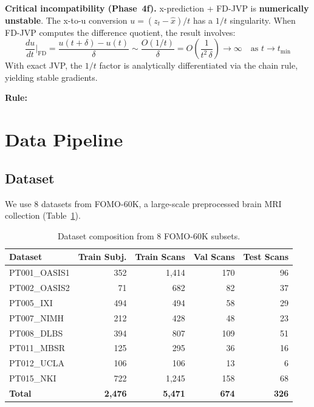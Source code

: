 \documentclass[11pt,a4paper]{article}
\begin{document}
\textbf{Critical incompatibility (Phase~4f).}  x-prediction + FD-JVP is
\textbf{numerically unstable}.  The x-to-u conversion
$u = (z_t - \hat{x})/t$ has a $1/t$ singularity.  When FD-JVP computes
the difference quotient, the result involves:
\begin{equation}
  \frac{du}{dt}\bigg|_\mathrm{FD}
    = \frac{u(t{+}\delta)-u(t)}{\delta}
    \sim \frac{O(1/t)}{\delta}
    = O\!\left(\frac{1}{t^2\,\delta}\right) \to \infty
  \quad\text{as }t\to t_{\min}
  \label{eq:fd_instability}
\end{equation}
With exact JVP, the $1/t$ factor is analytically differentiated via the
chain rule, yielding stable gradients.

\textbf{Rule:} \ \ %
\ \ %


\section{Data Pipeline}
\label{sec:data}

\subsection{Dataset}

We use 8 datasets from FOMO-60K, a large-scale preprocessed brain MRI
collection (Table~\ref{tab:dataset}).

\begin{table}[ht]
\centering
\caption{Dataset composition from 8 FOMO-60K subsets.}
\label{tab:dataset}
\begin{tabular}{lrrrr}
\toprule
\textbf{Dataset} & \textbf{Train Subj.} & \textbf{Train Scans} & \textbf{Val Scans} & \textbf{Test Scans} \\
\midrule
PT001\_OASIS1 & 352  & 1,414 & 170 & 96 \\
PT002\_OASIS2 & 71   & 682   & 82  & 37 \\
PT005\_IXI    & 494  & 494   & 58  & 29 \\
PT007\_NIMH   & 212  & 428   & 48  & 23 \\
PT008\_DLBS   & 394  & 807   & 109 & 51 \\
PT011\_MBSR   & 125  & 295   & 36  & 16 \\
PT012\_UCLA   & 106  & 106   & 13  & 6  \\
PT015\_NKI    & 722  & 1,245 & 158 & 68 \\
\midrule
\textbf{Total} & \textbf{2,476} & \textbf{5,471} & \textbf{674} & \textbf{326} \\
\bottomrule
\end{tabular}
\end{table}
\end{document}
